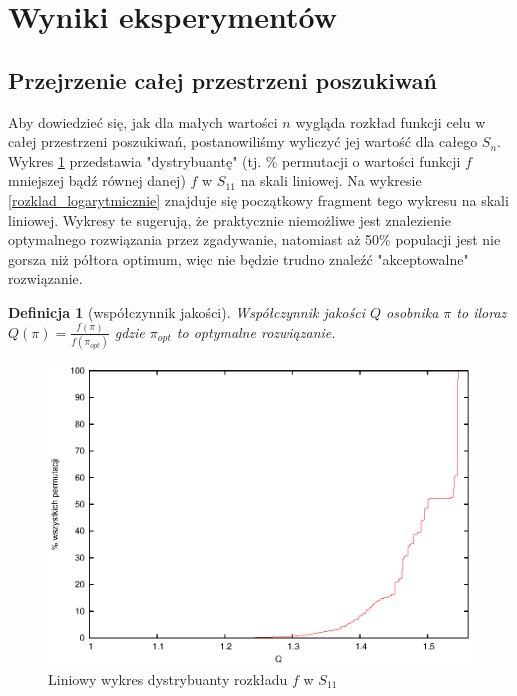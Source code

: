 \documentclass[11pt, a4wide]{mwart}
\newtheorem{definition}{Definicja}
\begin{document}
\section{Wyniki eksperymentów}

\subsection{Przejrzenie całej przestrzeni poszukiwań}
Aby dowiedzieć się, jak dla małych wartości $n$ wygląda rozkład funkcji celu w
całej przestrzeni poszukiwań, postanowiliśmy wyliczyć jej wartość dla całego
$S_n$.  Wykres \ref{rozklad_liniowo} przedstawia "dystrybuantę" (tj. \%
permutacji o wartości funkcji $f$ mniejszej bądź równej danej) $f$ w $S_{11}$
na skali liniowej. Na wykresie \ref{rozklad_logarytmicznie} znajduje się
początkowy fragment tego wykresu na skali liniowej. Wykresy te sugerują, że
praktycznie niemożliwe jest znalezienie optymalnego rozwiązania przez
zgadywanie, natomiast aż 50\% populacji jest nie gorsza niż półtora optimum,
więc nie będzie trudno znaleźć "akceptowalne" rozwiązanie.

\begin{definition}[współczynnik jakości]
Współczynnik jakości $Q$ osobnika $\pi$ to iloraz 
$ Q(\pi) = \frac{f(\pi)}{f(\pi_{opt})}$
gdzie $\pi_{opt}$ to optymalne rozwiązanie.
\end{definition}

\begin{figure}[H]
\caption{Liniowy wykres dystrybuanty rozkładu $f$ w $S_{11}$}
\label{rozklad_liniowo}
\begin{center}
  \includegraphics{dystrybuanta_bez_logarytmicznej.eps}
\end{center}
\end{figure}
\end{document}
